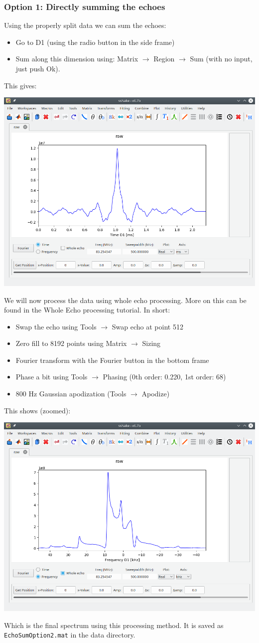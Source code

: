 \documentclass[11pt,a4paper]{article}
\begin{document}
\subsubsection{Option 1: Directly summing the echoes}
Using the properly split data we can sum the echoes:
\begin{itemize}
  \item Go to D1 (using the radio button in the side frame)
  \item Sum along this dimension using: Matrix $\longrightarrow$ Region $\longrightarrow$ Sum (with
	 no input, just push Ok).
\end{itemize}
This gives:
\begin{center}
\includegraphics[width=0.7\linewidth]{Figs/Fig5.png}
\end{center}

We will now process the data using whole echo processing. More on this can be found in the Whole
Echo processing tutorial. In short:
\begin{itemize}
  \item Swap the echo using Tools $\longrightarrow$ Swap echo at point 512
  \item Zero fill to 8192 points using Matrix $\longrightarrow$ Sizing
  \item Fourier transform with the Fourier button in the bottom frame
  \item Phase a bit using Tools $\longrightarrow$ Phasing (0th order: 0.220, 1st order: 68)
  \item 800 Hz Gaussian apodization (Tools $\longrightarrow$ Apodize)
\end{itemize}
This shows (zoomed):
\begin{center}
\includegraphics[width=0.7\linewidth]{Figs/Fig6.png}
\end{center}
Which is the final spectrum using this processing method. It is saved as \texttt{EchoSumOption2.mat}
in the data directory.
\end{document}
